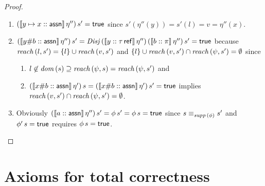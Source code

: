 \documentclass[12pt,a4paper]{report}
\newcommand{\Disj}{\nstyle{Disj}}
\begin{document}
\begin{proof}
\begin{itemize}
\begin{enumerate}
            \item $(\llbracket{y\mapsto x}\mathrel{::}{\mathsf{assn}}\rrbracket\,\eta'')\,s'=\mathsf{true}$ since
                  $s'(\eta''(y)) = s'(l) = v = \eta''(x)$.
            \item $(\semantic{\tj{y\#b}{\tassn}}\,\eta'')\,s'
                   = \Disj\,(\semantic{\tj{y}{\tref{\tau}}}\,\eta'')\,(\semantic{\tj{b}{\pi}}\,\eta'')\,s'=\true$
                  because $\mathit{reach}\,(l,s')=\{l\}\cup\mathit{reach}\,(v,s')$ and
                  $\{l\}\cup\mathit{reach}\,(v,s')\cap\mathit{reach}\,(\psi,s')=\emptyset$ since
                  \begin{enumerate}
                    \item $l\not\in\mathit{dom}\,(s) \supseteq \mathit{reach}\,(\psi,s) = \mathit{reach}\,(\psi,s')$ and
                    \item $(\llbracket{x\#b}\mathrel{::}{\mathsf{assn}}\rrbracket\,\eta')\,s
                           =(\llbracket{x\#b}\mathrel{::}{\mathsf{assn}}\rrbracket\,\eta')\,s'=\mathsf{true}$ implies
                          $\mathit{reach}\,(v,s') \cap \mathit{reach}\,(\psi,s') = \emptyset$.
                  \end{enumerate}
            \item Obviously
                  $(\llbracket{a}\mathrel{::}{\mathsf{assn}}\rrbracket\,\eta'')\,s'=\phi\,s'=\phi\,s=\mathsf{true}$ since
                  $s \equiv_{\mathit{supp}\,(\phi)} s'$ and $\phi'\,s=\mathsf{true}$ requires $\phi\,s=\mathsf{true}$.
          \end{enumerate}
  \end{itemize}
\end{proof}



\section{Axioms for total correctness}
\end{document}
